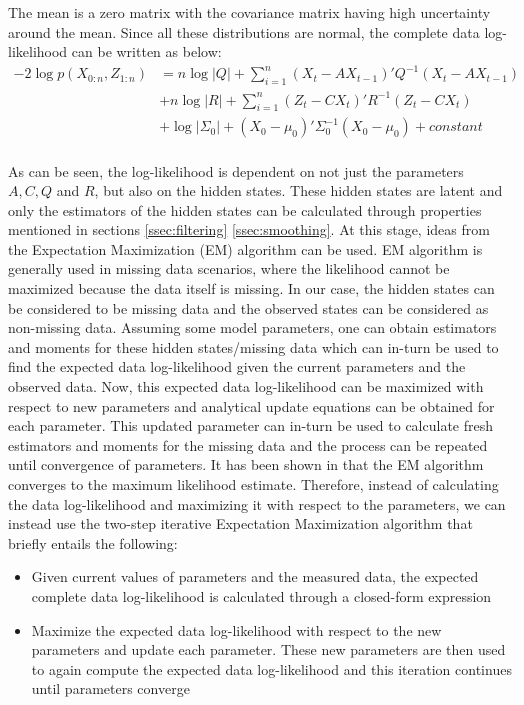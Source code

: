 \documentclass{article}
\begin{document}
The mean is a zero matrix with the covariance matrix having high uncertainty around the mean. Since all these distributions are normal, the complete data log-likelihood can be written as below:
\begin{equation} \label{eq:21}
\begin{split}
     -2\log p(X_{0:n},Z_{1:n}) &=n\log |Q| +\sum_{i=1}^n(X_t-AX_{t-1})'Q^{-1}(X_t-AX_{t-1})  \\ 
 & +n\log |R|+\sum_{i=1}^n(Z_t-CX_t)'R^{-1}(Z_t-CX_t)\\
 & + \log|\Sigma_0| + (X_0-\mu_0)'\Sigma_0^{-1}(X_0-\mu_0) + constant\\
\end{split}
\end{equation}

As can be seen, the log-likelihood is dependent on not just the parameters $A,C, Q$ and $R$, but also on the hidden states. These hidden states are latent and only the estimators of the hidden states can be calculated through properties mentioned in sections \ref{ssec:filtering} \ref{ssec:smoothing}. At this stage, ideas from the Expectation Maximization (EM) \cite{dempster_maximum_1977} algorithm can be used. EM algorithm is generally used in missing data scenarios, where the likelihood cannot be maximized because the data itself is missing.  In our case, the hidden states can be considered to be missing data and the observed states can be considered as non-missing data. Assuming some model parameters, one can obtain estimators and moments for these hidden states/missing data which can in-turn be used to find the expected data log-likelihood given the current parameters and the observed data. Now, this expected data log-likelihood can be maximized with respect to new parameters and analytical update equations can be obtained for each parameter. This updated parameter can in-turn be used to calculate fresh estimators and moments for the missing data and the process can be repeated until convergence of parameters. It has been shown in \cite{dempster_maximum_1977} that the EM algorithm converges to the maximum likelihood estimate. Therefore, instead of calculating the data log-likelihood and maximizing it with respect to the parameters, we can instead use the two-step iterative Expectation Maximization algorithm that briefly entails the following:
\begin{itemize}
    \item Given current values of parameters and the measured data, the expected complete data log-likelihood is calculated through a closed-form expression
    \item Maximize the expected data log-likelihood with respect to the new parameters and update each parameter. These new parameters are then used to again compute the expected data log-likelihood and this iteration continues until parameters converge
\end{itemize}
\end{document}
